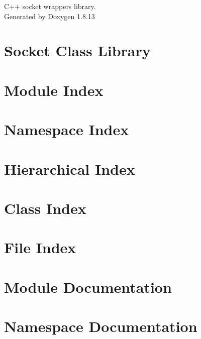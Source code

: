 \documentclass[twoside]{book}
\newcommand{\+}{\discretionary{\mbox{\scriptsize$\hookleftarrow$}}{}{}}
\newcommand{\clearemptydoublepage}{%
  \newpage{\pagestyle{empty}\cleardoublepage}%
}
\begin{document}
\hypersetup{pageanchor=false,
             bookmarksnumbered=true,
             pdfencoding=unicode
            }
\begin{titlepage}
\vspace*{7cm}
\begin{center}%
{\Large C++ socket wrappers library. }\\
\vspace*{1cm}
{\large Generated by Doxygen 1.8.13}\\
\end{center}
\end{titlepage}
\clearemptydoublepage
{}
\tableofcontents
\clearemptydoublepage
{}
\hypersetup{pageanchor=true}

\chapter{Socket Class Library}
\label{index}\hypertarget{index}{}
\chapter{Module Index}

\chapter{Namespace Index}

\chapter{Hierarchical Index}

\chapter{Class Index}

\chapter{File Index}

\chapter{Module Documentation}


\chapter{Namespace Documentation}

\end{document}
